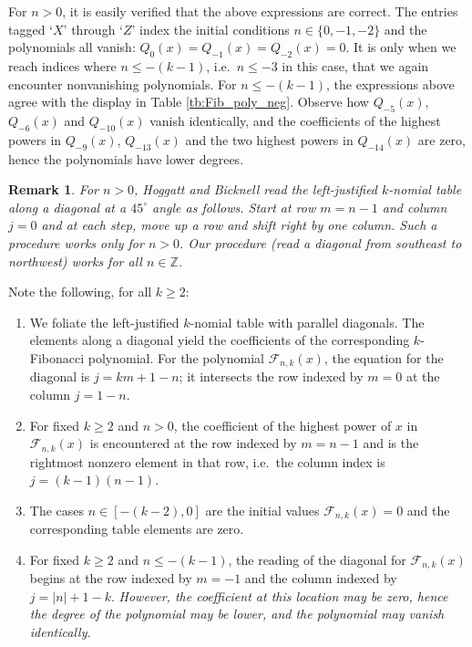 \documentclass[review]{elsarticle}
\theoremstyle{plain}
\newtheorem{remark}[theorem]{Remark}
\begin{document}
For $n>0$, it is easily verified that the above expressions are correct.
The entries tagged `$X$' through `$Z$' index the initial conditions $n\in\{0,-1,-2\}$ and the polynomials all vanish: $Q_{0}(x)=Q_{-1}(x)=Q_{-2}(x)=0$.
It is only when we reach indices where $n \le -(k-1)$, i.e.~$n\le-3$ in this case, that we again encounter nonvanishing polynomials.  
For $n\le-(k-1)$, the expressions above agree with the display in Table \ref{tb:Fib_poly_neg}.
Observe how $Q_{-5}(x)$, $Q_{-6}(x)$ and $Q_{-10}(x)$ vanish identically,
and the coefficients of the highest powers in $Q_{-9}(x)$, $Q_{-13}(x)$
and the two highest powers in $Q_{-14}(x)$ are zero,
hence the polynomials have lower degrees.
\begin{remark}
For $n>0$, Hoggatt and Bicknell \cite{HoggattBicknell_FibGen} read the left-justified $k$-nomial table along a diagonal at a $45^\circ$ angle as follows.
Start at row $m=n-1$ and column $j=0$ and at each step, move up a row and shift right by one column.
Such a procedure works only for $n>0$.
Our procedure (read a diagonal from southeast to northwest) works for all $n\in\mathbb{Z}$.
\end{remark}
Note the following, for all $k\ge2$:
\begin{enumerate}
\item
We foliate the left-justified $k$-nomial table with parallel diagonals.
The elements along a diagonal yield the coefficients of the corresponding $k$-Fibonacci polynomial.  
For the polynomial $\mathcal{F}_{n,k}(x)$, the equation for the diagonal is $j = km + 1-n$; it intersects the row indexed by $m=0$ at the column $j=1-n$.
\item
For fixed $k\ge2$ and $n>0$, the coefficient of the highest power of $x$ in $\mathcal{F}_{n,k}(x)$ is encountered at the row indexed by $m=n-1$
and is the rightmost nonzero element in that row, i.e.~the column index is $j=(k-1)(n-1)$.
\item
  The cases $n\in[-(k-2),0]$ are the initial values $\mathcal{F}_{n,k}(x)=0$ and the corresponding table elements are zero.
\item
For fixed $k\ge2$ and $n\le-(k-1)$,
the reading of the diagonal for $\mathcal{F}_{n,k}(x)$ begins at the row indexed by $m=-1$ and the column indexed by $j=|n|+1-k$.
\emph{However, the coefficient at this location may be zero, hence the degree of the polynomial may be lower, and the polynomial may vanish identically.}
\end{enumerate}

\end{document}
